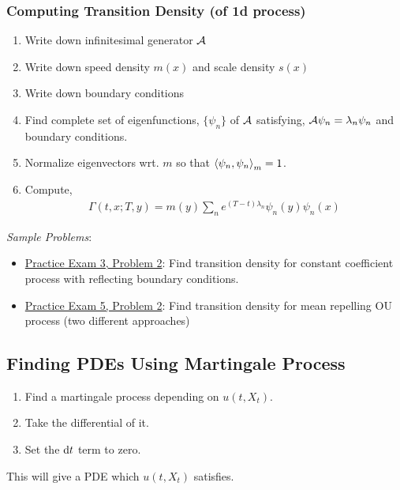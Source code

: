 \documentclass[12pt]{article}
\begin{document}
\subsubsection{Computing Transition Density (of 1d process)}
\begin{enumerate}[nolistsep]
    \item Write down infinitesimal generator \( \mathcal{A} \)
    \item Write down speed density \( m(x) \) and scale density \( s(x) \)
    \item Write down boundary conditions
    \item Find complete set of eigenfunctions, \( \{ \psi_n \} \) of \( \mathcal{A} \) satisfying, \( \mathcal{A} \psi_n = \lambda_n\psi_n \) and boundary conditions.
    \item Normalize eigenvectors wrt. \( m \) so that \( \left\langle \psi_n,\psi_n \right\rangle_m = 1 \).
    \item Compute,
        \begin{align*}
            \Gamma(t,x;T,y) = m(y)\sum_{n} e^{(T-t)\lambda_n} \psi_n(y)\psi_n(x)
        \end{align*}
\end{enumerate}

\textit{Sample Problems}:
\begin{itemize}[nolistsep]
    \item \hyperref[Practice Exam 3, Problem 2]{Practice Exam 3, Problem 2}: Find transition density for constant coefficient process with reflecting boundary conditions.
    \item \hyperref[Practice Exam 5, Problem 2]{Practice Exam 5, Problem 2}: Find transition density for mean repelling OU process (two different approaches)
\end{itemize}



\subsection{Finding PDEs Using Martingale Process}
\begin{enumerate}[nolistsep]
    \item Find a martingale process depending on \( u(t,X_t) \).
    \item Take the differential of it.
    \item Set the \( \mathrm{d} t \) term to zero.
\end{enumerate}

This will give a PDE which \( u(t,X_t) \) satisfies.
\end{document}
